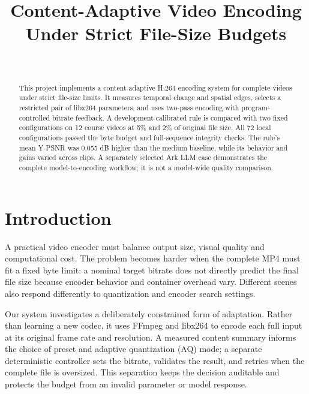 \documentclass[conference]{IEEEtran}
\begin{document}
\title{Content-Adaptive Video Encoding Under Strict File-Size Budgets}
\author{\\}
\maketitle
\begin{abstract}
This project implements a content-adaptive H.264 encoding system for complete videos under strict file-size limits. It measures temporal change and spatial edges, selects a restricted pair of libx264 parameters, and uses two-pass encoding with program-controlled bitrate feedback. A development-calibrated rule is compared with two fixed configurations on 12 course videos at 5\% and 2\% of original file size. All 72 local configurations passed the byte budget and full-sequence integrity checks. The rule's mean Y-PSNR was 0.055 dB higher than the medium baseline, while its behavior and gains varied across clips. A separately selected Ark LLM case demonstrates the complete model-to-encoding workflow; it is not a model-wide quality comparison.
\end{abstract}
\section{Introduction}
A practical video encoder must balance output size, visual quality and computational cost. The problem becomes harder when the complete MP4 must fit a fixed byte limit: a nominal target bitrate does not directly predict the final file size because encoder behavior and container overhead vary. Different scenes also respond differently to quantization and encoder search settings.

Our system investigates a deliberately constrained form of adaptation. Rather than learning a new codec, it uses FFmpeg and libx264 to encode each full input at its original frame rate and resolution. A measured content summary informs the choice of preset and adaptive quantization (AQ) mode; a separate deterministic controller sets the bitrate, validates the result, and retries when the complete file is oversized. This separation keeps the decision auditable and protects the budget from an invalid parameter or model response.
\end{document}
